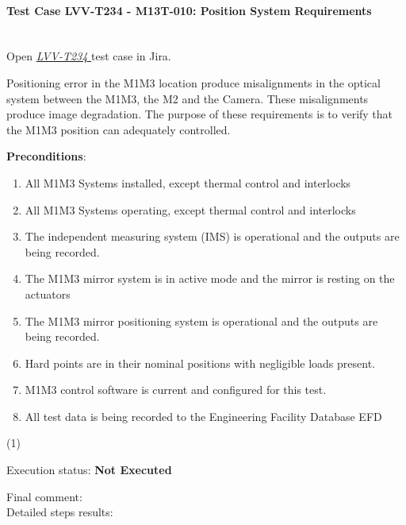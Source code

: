 \documentclass[SE,lsstdraft,STR,toc]{lsstdoc}
\providecommand{\tightlist}{
  \setlength{\itemsep}{0pt}\setlength{\parskip}{0pt}}
\begin{document}
\paragraph{Test Case LVV-T234 - M13T-010: Position System Requirements }\mbox{}\\

Open  \href{https://jira.lsstcorp.org/secure/Tests.jspa#/testCase/LVV-T234}{\textit{ LVV-T234 } }
test case in Jira.

Positioning error in the M1M3 location produce misalignments in the
optical system between the M1M3, the M2 and the Camera. These
misalignments produce image degradation. The purpose of these
requirements is to verify that the M1M3 position can adequately
controlled.

\textbf{ Preconditions}:\\
\begin{enumerate}
\tightlist
\item
  All M1M3 Systems installed, except thermal control and interlocks
\item
  All M1M3 Systems operating, except thermal control and interlocks
\item
  The independent measuring system (IMS) is operational and the outputs
  are being recorded.
\item
  The M1M3 mirror system is in active mode and the mirror is resting on
  the actuators
\item
  The M1M3 mirror positioning system is operational and the outputs are
  being recorded.
\item
  Hard points are in their nominal positions with negligible loads
  present.
\item
  M1M3 control software is current and configured for this test.
\item
  All test data is being recorded to the Engineering Facility Database
  EFD
\end{enumerate}

(1)

Execution status: {\bf Not Executed }

Final comment:\\


Detailed steps results:
\end{document}
